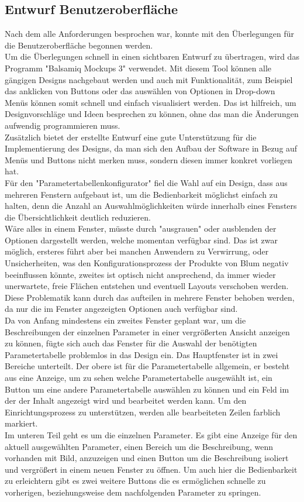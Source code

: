 \documentclass[a4paper,12pt,top=2.5cm,bottom=2.5cm, left=2.5cm, right=2.5cm, numbers=noenddot]{scrartcl}
\begin{document}
\subsection{Entwurf Benutzeroberfläche}
Nach dem alle Anforderungen besprochen war, konnte mit den Überlegungen für die Benutzeroberfläche begonnen werden. \\
Um die Überlegungen schnell in einen sichtbaren Entwurf zu übertragen, wird das Programm "Balsamiq Mockups 3" verwendet. Mit diesem Tool können alle gängigen Designs nachgebaut werden und auch mit Funktionalität, zum Beispiel das anklicken von Buttons oder das auswählen von Optionen in Drop-down Menüs können somit schnell und einfach visualisiert werden. Das ist hilfreich, um Designvorschläge und Ideen besprechen zu können, ohne das man die Änderungen aufwendig programmieren muss.
\\Zusätzlich bietet der erstellte Entwurf eine gute Unterstützung für die Implementierung des Designs, da man sich den Aufbau der Software in Bezug auf Menüs und Buttons nicht merken muss, sondern diesen immer konkret vorliegen hat.
\\Für den "Parametertabellenkonfigurator" fiel die Wahl auf ein Design, dass aus mehreren Fenstern aufgebaut ist, um die Bedienbarkeit möglichst einfach zu halten, denn die Anzahl an Auswahlmöglichkeiten würde innerhalb eines Fensters die Übersichtlichkeit deutlich reduzieren.
\\ Wäre alles in einem Fenster, müsste durch "ausgrauen" oder ausblenden der Optionen dargestellt werden, welche momentan verfügbar sind. Das ist zwar möglich, ersteres führt aber bei manchen Anwendern zu Verwirrung, oder Unsicherheiten, was den Konfigurationsprozess der Produkte von Blum negativ beeinflussen könnte, zweites ist optisch nicht ansprechend, da immer wieder unerwartete, freie Flächen entstehen und eventuell Layouts verschoben werden. \\
Diese Problematik kann durch das aufteilen in mehrere Fenster behoben werden, da nur die im Fenster angezeigten Optionen auch verfügbar sind. 
\\Da von Anfang mindestens ein zweites Fenster geplant war, um die Beschreibungen der einzelnen Parameter in einer vergrößerten Ansicht anzeigen zu können, fügte sich auch das Fenster für die Auswahl der benötigten Parametertabelle problemlos in das Design ein. 
Das Hauptfenster ist in zwei Bereiche unterteilt. Der obere ist für die Parametertabelle allgemein, er besteht aus eine Anzeige, um zu sehen welche Parametertabelle ausgewählt ist, ein Button um eine andere Parametertabelle auswählen zu können und ein Feld im der der Inhalt angezeigt wird und bearbeitet werden kann. Um den Einrichtungsprozess zu unterstützen, werden alle bearbeiteten Zeilen farblich markiert. 
\\Im unteren Teil geht es um die einzelnen Parameter. Es gibt eine Anzeige für den aktuell ausgewählten Parameter, einen Bereich um die Beschreibung, wenn vorhanden mit Bild, anzuzeigen und einen Button um die Beschreibung isoliert und vergrößert in einem neuen Fenster zu öffnen. Um auch hier die Bedienbarkeit zu erleichtern gibt es zwei weitere Buttons die es ermöglichen schnelle zu vorherigen, beziehungsweise dem nachfolgenden Parameter zu springen.
\end{document}
